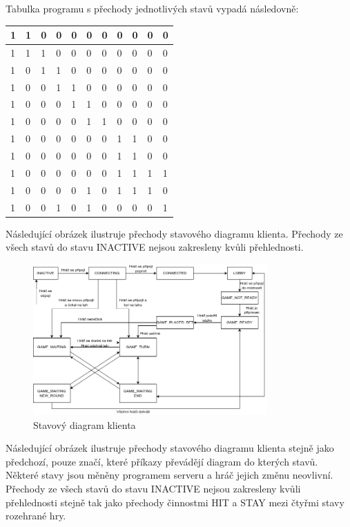 \documentclass[12pt]{article}
\begin{document}
Tabulka programu s přechody jednotlivých stavů vypadá následovně:

\begin{table}[!hbtp]
\begin{tabular}{|l|l|l|l|l|l|l|l|l|l|l|}
\hline
1 & 1 & 0 & 0 & 0 & 0 & 0 & 0 & 0 & 0 & 0 \\ \hline
1 & 1 & 1 & 0 & 0 & 0 & 0 & 0 & 0 & 0 & 0 \\ \hline
1 & 0 & 1 & 1 & 0 & 0 & 0 & 0 & 0 & 0 & 0 \\ \hline
1 & 0 & 0 & 1 & 1 & 0 & 0 & 0 & 0 & 0 & 0 \\ \hline
1 & 0 & 0 & 0 & 1 & 1 & 0 & 0 & 0 & 0 & 0 \\ \hline
1 & 0 & 0 & 0 & 0 & 1 & 1 & 0 & 0 & 0 & 0 \\ \hline
1 & 0 & 0 & 0 & 0 & 0 & 0 & 1 & 1 & 0 & 0 \\ \hline
1 & 0 & 0 & 0 & 0 & 0 & 0 & 1 & 1 & 0 & 0 \\ \hline
1 & 0 & 0 & 0 & 0 & 0 & 0 & 1 & 1 & 1 & 1 \\ \hline
1 & 0 & 0 & 0 & 0 & 1 & 0 & 1 & 1 & 1 & 0 \\ \hline
1 & 0 & 0 & 1 & 0 & 1 & 0 & 0 & 0 & 0 & 1 \\ \hline
\end{tabular}
\end{table}
\newpage
Následující obrázek ilustruje přechody stavového diagramu klienta. Přechody ze všech stavů do stavu INACTIVE nejsou zakresleny kvůli přehlednosti.

\begin{figure}[htbp]
\centering
\includegraphics[width=0.8\textwidth]{stateDiagram.png}
\caption{Stavový diagram klienta}
\end{figure}

\newpage
Následující obrázek ilustruje přechody stavového diagramu klienta stejně jako předchozí, pouze značí, které příkazy převádějí diagram do kterých stavů. Některé stavy jsou měněny programem serveru a hráč jejich změnu neovlivní. Přechody ze všech stavů do stavu INACTIVE nejsou zakresleny kvůli přehlednosti stejně tak jako přechody činnostmi HIT a STAY mezi čtyřmi stavy rozehrané hry.
\end{document}
